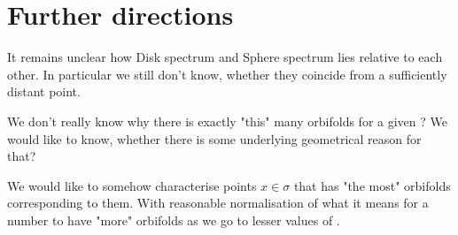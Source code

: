 \section{Further directions}
It remains unclear how Disk spectrum and Sphere spectrum lies relative to each other. 
In particular we still don't know, whether they coincide from a sufficiently distant point.

We don't really know why there is exactly "this" many orbifolds for a given \Eoc? 
We would like to know, whether there is some underlying geometrical reason for that?

We would like to somehow characterise points $x \in \sigma$ that has "the most" 
orbifolds corresponding to them. With reasonable normalisation of what it means for a number
to have "more" orbifolds as we go to lesser values of \Eoc. 


